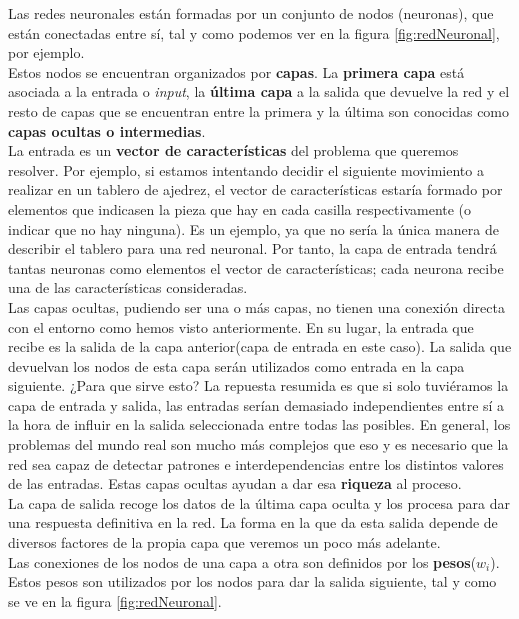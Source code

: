 \documentclass[11pt,fleqn]{book} %
\begin{document}
Las redes neuronales están formadas por un conjunto de nodos (neuronas), que están conectadas entre sí, tal y como podemos ver en la figura \ref{fig:redNeuronal}, por ejemplo. \\

Estos nodos se encuentran organizados por \textbf{capas}. La \textbf{primera capa} está asociada a la entrada o \textit{input}, la \textbf{última capa} a la salida que devuelve la red y el resto de capas que se encuentran entre la primera y la última son conocidas como \textbf{capas ocultas o intermedias}. \\

La entrada es un \textbf{vector de características} del problema que queremos resolver. Por ejemplo, si estamos intentando decidir el siguiente movimiento a realizar en un tablero de ajedrez, el vector de características estaría formado por elementos que indicasen la pieza que hay en cada casilla respectivamente (o indicar que no hay ninguna). Es un ejemplo, ya que no sería la única manera de describir el tablero para una red neuronal. Por tanto, la capa de entrada tendrá tantas neuronas como elementos el vector de características; cada neurona recibe una de las características consideradas. \\

Las capas ocultas, pudiendo ser una o más capas, no tienen una conexión directa con el entorno como hemos visto anteriormente. En su lugar, la entrada que recibe es la salida de la capa anterior(capa de entrada en este caso). La salida que devuelvan los nodos de esta capa serán utilizados como entrada en la capa siguiente. ¿Para que sirve esto? La repuesta resumida es que si solo tuviéramos la capa de entrada y salida, las entradas serían demasiado independientes entre sí a la hora de influir en la salida seleccionada entre todas las posibles. En general, los problemas del mundo real son mucho más complejos que eso y es necesario que la red sea capaz de detectar patrones e interdependencias entre los distintos valores de las entradas. Estas capas ocultas ayudan a dar esa \textbf{riqueza} al proceso.\cite{article:redNeuronal2}\\

La capa de salida recoge los datos de la última capa oculta y los procesa para dar una respuesta definitiva en la red. La forma en la que da esta salida depende de diversos factores de la propia capa que veremos un poco más adelante. \\

Las conexiones de los nodos de una capa a otra son definidos por los \textbf{pesos}($w_i$). Estos pesos son utilizados por los nodos para dar la salida siguiente, tal y como se ve en la figura \ref{fig:redNeuronal}.
\end{document}
